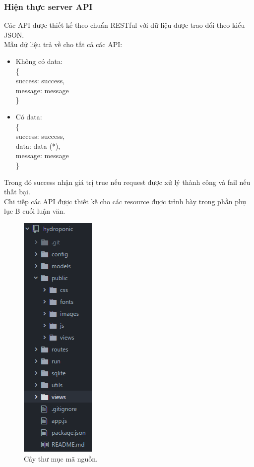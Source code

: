 \documentclass[a4paper,12pt,oneside]{article}
\begin{document}
\subsubsection{Hiện thực server API}
\noindent Các API được thiết kế theo chuẩn RESTful với dữ liệu được trao đổi theo kiểu JSON.\\
\noindent Mẫu dữ liệu trả về cho tất cả các API:
\begin{itemize}
\item Không có data:\\
\{\\
\hspace{\labelwidth}success: success,\\
\hspace{\labelwidth}message: message\\
\}
\item Có data:\\
\{\\
\hspace{\labelwidth} success: success,\\
\hspace{\labelwidth} data: data (*),\\
\hspace{\labelwidth} message: message\\
\}

\end{itemize}
\noindent Trong đó success nhận giá trị true nếu request được xử lý thành công và fail nếu thất bại.\\
\noindent Chi tiếp các API được thiết kế cho các resource được trình bày trong phần phụ lục B cuối luận văn.

\begin{center}
\begin{figure}[H]
\begin{center}
\includegraphics[scale=1.]{hinh/folder.png}
\end{center}
\caption{Cây thư mục mã nguồn.}
\end{figure}
\end{center}
\end{document}
